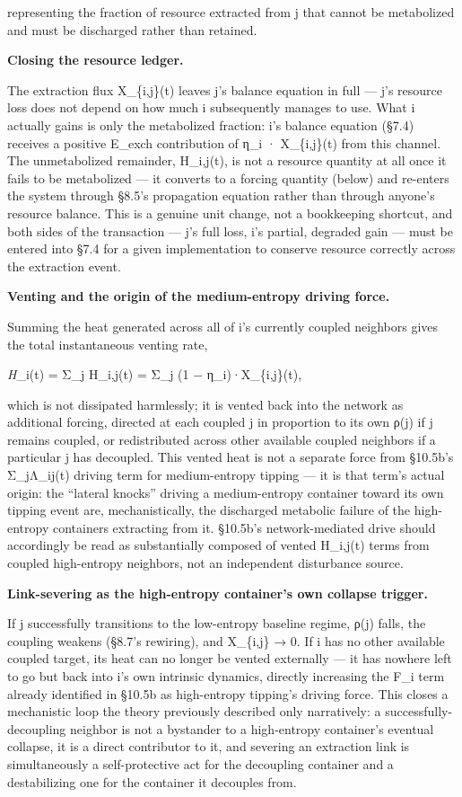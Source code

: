 \documentclass[
]{article}
\begin{document}
representing the fraction of resource extracted from j that cannot be
metabolized and must be discharged rather than retained.

\textbf{Closing the resource ledger.}

The extraction flux X\_\{i,j\}(t) leaves j's balance equation in full
--- j's resource loss does not depend on how much i subsequently manages
to use. What i actually gains is only the metabolized fraction: i's
balance equation (§7.4) receives a positive E\_exch contribution of η\_i
· X\_\{i,j\}(t) from this channel. The unmetabolized remainder,
H\_i,j(t), is not a resource quantity at all once it fails to be
metabolized --- it converts to a forcing quantity (below) and re-enters
the system through §8.5's propagation equation rather than through
anyone's resource balance. This is a genuine unit change, not a
bookkeeping shortcut, and both sides of the transaction --- j's full
loss, i's partial, degraded gain --- must be entered into §7.4 for a
given implementation to conserve resource correctly across the
extraction event.

\textbf{Venting and the origin of the medium-entropy driving force.}

Summing the heat generated across all of i's currently coupled neighbors
gives the total instantaneous venting rate,

\emph{H}\_i(t) = Σ\_j H\_i,j(t) = Σ\_j (1 − η\_i)·X\_\{i,j\}(t),

which is not dissipated harmlessly; it is vented back into the network
as additional forcing, directed at each coupled j in proportion to its
own ρ(j) if j remains coupled, or redistributed across other available
coupled neighbors if a particular j has decoupled. This vented heat is
not a separate force from §10.5b's Σ\_jΛ\_ij(t) driving term for
medium-entropy tipping --- it is that term's actual origin: the
``lateral knocks'' driving a medium-entropy container toward its own
tipping event are, mechanistically, the discharged metabolic failure of
the high-entropy containers extracting from it. §10.5b's
network-mediated drive should accordingly be read as substantially
composed of vented H\_i,j(t) terms from coupled high-entropy neighbors,
not an independent disturbance source.

\textbf{Link-severing as the high-entropy container's own collapse
trigger.}

If j successfully transitions to the low-entropy baseline regime, ρ(j)
falls, the coupling weakens (§8.7's rewiring), and X\_\{i,j\} → 0. If i
has no other available coupled target, its heat can no longer be vented
externally --- it has nowhere left to go but back into i's own intrinsic
dynamics, directly increasing the F\_i term already identified in §10.5b
as high-entropy tipping's driving force. This closes a mechanistic loop
the theory previously described only narratively: a
successfully-decoupling neighbor is not a bystander to a high-entropy
container's eventual collapse, it is a direct contributor to it, and
severing an extraction link is simultaneously a self-protective act for
the decoupling container and a destabilizing one for the container it
decouples from.
\end{document}

